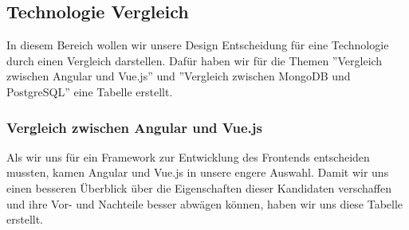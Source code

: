 \newpage
\subsection{Technologie Vergleich}
In diesem Bereich wollen wir unsere Design Entscheidung für eine Technologie durch einen Vergleich darstellen.
Dafür haben wir für die Themen ''Vergleich zwischen Angular und Vue.js'' und ''Vergleich zwischen MongoDB und PostgreSQL'' eine Tabelle erstellt.

\subsubsection{Vergleich zwischen Angular und Vue.js}

Als wir uns für ein Framework zur Entwicklung des Frontends entscheiden mussten, kamen Angular und Vue.js in unsere engere Auswahl.
Damit wir uns einen besseren Überblick über die Eigenschaften dieser Kandidaten verschaffen und ihre Vor- und Nachteile besser abwägen können, 
haben wir uns diese Tabelle erstellt.

